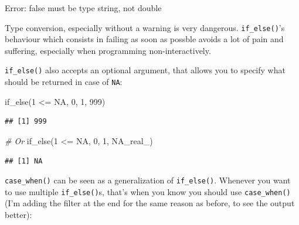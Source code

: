 \documentclass[
]{article}
\newenvironment{Shaded}{\begin{snugshade}}{\end{snugshade}}
\newcommand{\AttributeTok}[1]{\textcolor[rgb]{0.77,0.63,0.00}{#1}}
\newcommand{\CommentTok}[1]{\textcolor[rgb]{0.56,0.35,0.01}{\textit{#1}}}
\newcommand{\ConstantTok}[1]{\textcolor[rgb]{0.00,0.00,0.00}{#1}}
\newcommand{\DecValTok}[1]{\textcolor[rgb]{0.00,0.00,0.81}{#1}}
\newcommand{\FunctionTok}[1]{\textcolor[rgb]{0.00,0.00,0.00}{#1}}
\newcommand{\NormalTok}[1]{#1}
\newcommand{\SpecialCharTok}[1]{\textcolor[rgb]{0.00,0.00,0.00}{#1}}
\newcommand{\StringTok}[1]{\textcolor[rgb]{0.31,0.60,0.02}{#1}}
\begin{document}
\begin{Shaded}
\begin{Highlighting}[]
\NormalTok{Error}\SpecialCharTok{:} \StringTok{\textasciigrave{}}\AttributeTok{false}\StringTok{\textasciigrave{}}\NormalTok{ must be type string, not double}
\end{Highlighting}
\end{Shaded}

Type conversion, especially without a warning is very dangerous. \texttt{if\_else()}'s behaviour which
consists in failing as soon as possble avoids a lot of pain and suffering, especially when
programming non-interactively.

\texttt{if\_else()} also accepts an optional argument, that allows you to specify what should be returned
in case of \texttt{NA}:

\begin{Shaded}
\begin{Highlighting}[]
\FunctionTok{if\_else}\NormalTok{(}\DecValTok{1} \SpecialCharTok{\textless{}=} \ConstantTok{NA}\NormalTok{, }\DecValTok{0}\NormalTok{, }\DecValTok{1}\NormalTok{, }\DecValTok{999}\NormalTok{)}
\end{Highlighting}
\end{Shaded}

\begin{verbatim}
## [1] 999
\end{verbatim}

\begin{Shaded}
\begin{Highlighting}[]
\CommentTok{\# Or}
\FunctionTok{if\_else}\NormalTok{(}\DecValTok{1} \SpecialCharTok{\textless{}=} \ConstantTok{NA}\NormalTok{, }\DecValTok{0}\NormalTok{, }\DecValTok{1}\NormalTok{, }\ConstantTok{NA\_real\_}\NormalTok{)}
\end{Highlighting}
\end{Shaded}

\begin{verbatim}
## [1] NA
\end{verbatim}

\texttt{case\_when()} can be seen as a generalization of \texttt{if\_else()}. Whenever you want to use multiple
\texttt{if\_else()}s, that's when you know you should use \texttt{case\_when()} (I'm adding the filter at the end
for the same reason as before, to see the output better):
\end{document}
